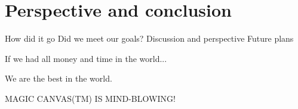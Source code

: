 \chapter{Perspective and conclusion}
How did it go
Did we meet our goals?
Discussion and perspective
Future plans

If we had all money and time in the world...

We are the best in the world.

MAGIC CANVAS(TM) IS MIND-BLOWING!